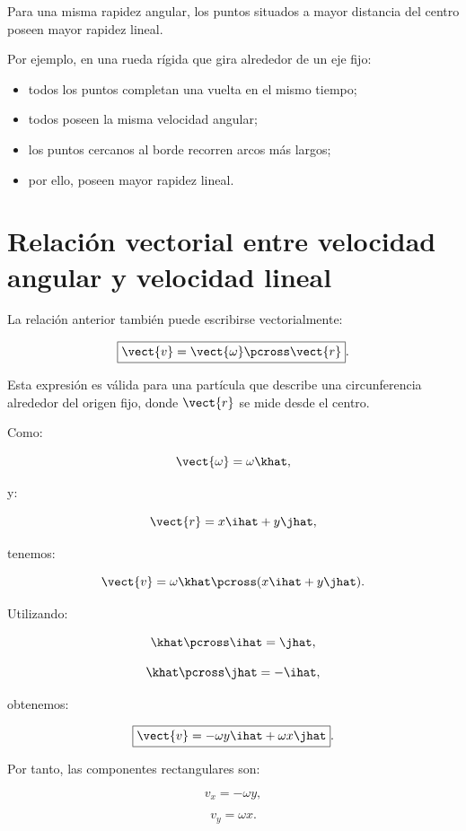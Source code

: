 \begin{interpretacion}

Para una misma rapidez angular, los puntos situados a mayor distancia del
centro poseen mayor rapidez lineal.

Por ejemplo, en una rueda rígida que gira alrededor de un eje fijo:

\begin{itemize}
    \item todos los puntos completan una vuelta en el mismo tiempo;
    \item todos poseen la misma velocidad angular;
    \item los puntos cercanos al borde recorren arcos más largos;
    \item por ello, poseen mayor rapidez lineal.
\end{itemize}

\end{interpretacion}


\section{Relación vectorial entre velocidad angular y velocidad lineal}

La relación anterior también puede escribirse vectorialmente:

\[
\boxed{
\vect{v}
=
\vect{\omega}\pcross\vect{r}
}.
\]

Esta expresión es válida para una partícula que describe una circunferencia
alrededor del origen fijo, donde \(\vect{r}\) se mide desde el centro.

Como:

\[
\vect{\omega}
=
\omega\khat,
\]

y:

\[
\vect{r}
=
x\ihat+y\jhat,
\]

tenemos:

\[
\vect{v}
=
\omega\khat
\pcross
(x\ihat+y\jhat).
\]

Utilizando:

\[
\khat\pcross\ihat=\jhat,
\]

\[
\khat\pcross\jhat=-\ihat,
\]

obtenemos:

\[
\boxed{
\vect{v}
=
-\omega y\ihat+\omega x\jhat
}.
\]

Por tanto, las componentes rectangulares son:

\[
\boxed{
v_x=-\omega y
},
\]

\[
\boxed{
v_y=\omega x
}.
\]

